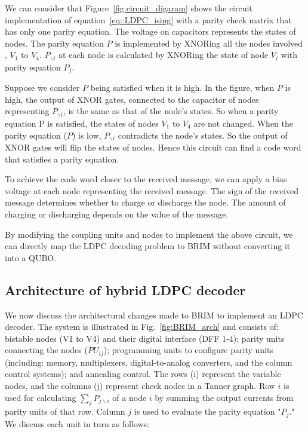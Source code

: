 We can consider that Figure~\ref{fig:circuit_digaram} shows the circuit implementation of equation~\ref{eq::LDPC_ising} with a parity check matrix that has only one parity equation. The voltage on capacitors represents the states of nodes. The parity equation $P$ is implemented by XNORing all the nodes involved \ie, $V_1$ to $V_4$. $P_{\backslash i}$ at each node is calculated by XNORing the state of node $V_i$ with parity equation $P_j$.

Suppose we consider $P$ being satisfied when it is high. In the figure, when $P$ is high, the output of XNOR gates, connected to the capacitor of nodes representing $P_{\backslash i}$, is the same as that of the node's states. So when a parity equation P is satisfied, the states of nodes $V_1$ to $V_4$ are not changed. When the parity equation ($P$) is low,  $P_{\backslash i}$ contradicts the node's states. So the output of XNOR gates will flip the states of nodes. Hence this circuit can find a code word that satisfies a parity equation. 

 To achieve the code word closer to the received message, we can apply a bias voltage at each node representing the received message. The sign of the received message determines whether to charge or discharge the node. The amount of charging or discharging depends on the value of the message.

By modifying the coupling units and nodes to implement the above circuit, we can directly map the LDPC decoding problem to BRIM without converting it into a QUBO.


\subsection{Architecture of hybrid LDPC decoder}
\label{ssec:arch}

We now discuss the architectural changes made to BRIM to implement an LDPC decoder. The system is illustrated in Fig.~\ref{fig:BRIM_arch} and consists of: 
 bistable nodes (V1 to V4) and their digital interface (DFF 1-4); 
 parity units connecting the nodes ($PU_{ij}$);  
programming units to configure parity units (including: memory, multiplexers,
digital-to-analog converters, and the column control systems); and  annealing control. The rows (i) represent the variable nodes, and the columns (j) represent check nodes in a Tanner graph. Row $i$ is used for calculating $\sum_j P_{j\backslash i}$ of a node $i$ by summing the output currents from parity units of that row. Column $j$  is used to evaluate the parity equation "$P_j$." We discuss each unit in turn as follows:


